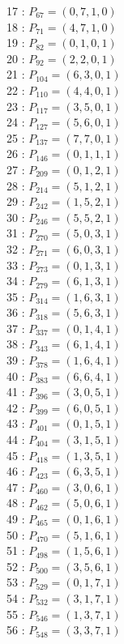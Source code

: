 \documentclass{article}
\begin{document}
{\begin{multicols}{3}
17 : $P_{67}=( 0, 7, 1, 0 )$\\
18 : $P_{71}=( 4, 7, 1, 0 )$\\
19 : $P_{82}=( 0, 1, 0, 1 )$\\
20 : $P_{92}=( 2, 2, 0, 1 )$\\
21 : $P_{104}=( 6, 3, 0, 1 )$\\
22 : $P_{110}=( 4, 4, 0, 1 )$\\
23 : $P_{117}=( 3, 5, 0, 1 )$\\
24 : $P_{127}=( 5, 6, 0, 1 )$\\
25 : $P_{137}=( 7, 7, 0, 1 )$\\
26 : $P_{146}=( 0, 1, 1, 1 )$\\
27 : $P_{209}=( 0, 1, 2, 1 )$\\
28 : $P_{214}=( 5, 1, 2, 1 )$\\
29 : $P_{242}=( 1, 5, 2, 1 )$\\
30 : $P_{246}=( 5, 5, 2, 1 )$\\
31 : $P_{270}=( 5, 0, 3, 1 )$\\
32 : $P_{271}=( 6, 0, 3, 1 )$\\
33 : $P_{273}=( 0, 1, 3, 1 )$\\
34 : $P_{279}=( 6, 1, 3, 1 )$\\
35 : $P_{314}=( 1, 6, 3, 1 )$\\
36 : $P_{318}=( 5, 6, 3, 1 )$\\
37 : $P_{337}=( 0, 1, 4, 1 )$\\
38 : $P_{343}=( 6, 1, 4, 1 )$\\
39 : $P_{378}=( 1, 6, 4, 1 )$\\
40 : $P_{383}=( 6, 6, 4, 1 )$\\
41 : $P_{396}=( 3, 0, 5, 1 )$\\
42 : $P_{399}=( 6, 0, 5, 1 )$\\
43 : $P_{401}=( 0, 1, 5, 1 )$\\
44 : $P_{404}=( 3, 1, 5, 1 )$\\
45 : $P_{418}=( 1, 3, 5, 1 )$\\
46 : $P_{423}=( 6, 3, 5, 1 )$\\
47 : $P_{460}=( 3, 0, 6, 1 )$\\
48 : $P_{462}=( 5, 0, 6, 1 )$\\
49 : $P_{465}=( 0, 1, 6, 1 )$\\
50 : $P_{470}=( 5, 1, 6, 1 )$\\
51 : $P_{498}=( 1, 5, 6, 1 )$\\
52 : $P_{500}=( 3, 5, 6, 1 )$\\
53 : $P_{529}=( 0, 1, 7, 1 )$\\
54 : $P_{532}=( 3, 1, 7, 1 )$\\
55 : $P_{546}=( 1, 3, 7, 1 )$\\
56 : $P_{548}=( 3, 3, 7, 1 )$\\
\end{multicols}


}
\end{document}
